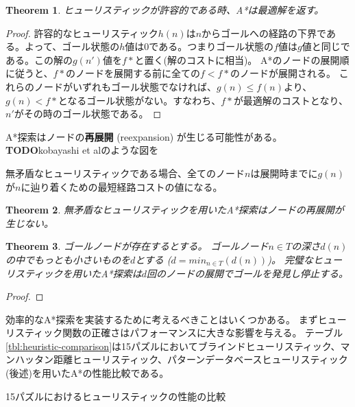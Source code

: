 \documentclass[10pt]{book}
\newtheorem{theorem}{Theorem}
\newcommand{\define}[2]{{\bf #1} (#2) \index{#1}\index{#2}}
\newcommand{\TODO}{{\bf TODO}}
\begin{document}
\begin{theorem}
ヒューリスティックが許容的である時、A*は最適解を返す。
\end{theorem}
\begin{proof}

許容的なヒューリスティック$h(n)$は$n$からゴールへの経路の下界である。よって、ゴール状態の$h$値は$0$である。つまりゴール状態の$f$値は$g$値と同じである。この解の$g(n')$値を$f*$と置く(解のコストに相当)。
A*のノードの展開順に従うと、$f*$のノードを展開する前に全ての$f<f*$のノードが展開される。
これらのノードがいずれもゴール状態でなければ、$g(n) \leq f(n)$より、$g(n)<f*$となるゴール状態がない。すなわち、$f*$が最適解のコストとなり、$n'$がその時のゴール状態である。

\end{proof}

A*探索はノードの\define{再展開}{reexpansion}が生じる可能性がある。
{\TODO kobayashi et alのような図を}

無矛盾なヒューリスティックである場合、全てのノード$n$は展開時までに$g(n)$が$n$に辿り着くための最短経路コストの値になる。

\begin{theorem}
無矛盾なヒューリスティックを用いたA*探索はノードの再展開が生じない。
\end{theorem}


\begin{theorem}
ゴールノードが存在するとする。
ゴールノード$n \in T$の深さ$d(n)$の中でもっとも小さいものを$d$とする ($d = min_{n \in T} (d(n))$)。
完璧なヒューリスティックを用いたA*探索は$d$回のノードの展開でゴールを発見し停止する。
\end{theorem}

\begin{proof}
\end{proof}

効率的なA*探索を実装するために考えるべきことはいくつかある。
まずヒューリスティック関数の正確さはパフォーマンスに大きな影響を与える。
テーブル\ref{tbl:heuristic-comparison}は15パズルにおいてブラインドヒューリスティック、マンハッタン距離ヒューリスティック、パターンデータベースヒューリスティック(後述)を用いたA*の性能比較である。


\begin{table}
\caption{15パズルにおけるヒューリスティックの性能の比較}
\label{tbl:heuristic-comparison}
\end{table}
\end{document}
